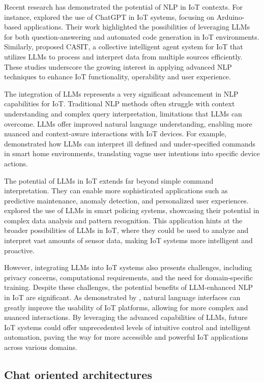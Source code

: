 \documentclass{ieeeaccess}
\begin{document}
Recent research has demonstrated the potential of NLP in IoT contexts. For instance, \citet{10315791} explored the use of ChatGPT in IoT systems, focusing on Arduino-based applications. Their work highlighted the possibilities of leveraging LLMs for both question-answering and automated code generation in IoT environments. Similarly, \citet{10439991} proposed CASIT, a collective intelligent agent system for IoT that utilizes LLMs to process and interpret data from multiple sources efficiently. These studies underscore the growing interest in applying advanced NLP techniques to enhance IoT functionality, operability and user experience.

The integration of LLMs represents a very significant advancement in NLP capabilities for IoT. Traditional NLP methods often struggle with context understanding and complex query interpretation, limitations that LLMs can overcome. LLMs offer improved natural language understanding, enabling more nuanced and context-aware interactions with IoT devices. For example, \citet{10.1145/3643505} demonstrated how LLMs can interpret ill defined and under-specified commands in smart home environments, translating vague user intentions into specific device actions.

The potential of LLMs in IoT extends far beyond simple command interpretation. They can enable more sophisticated applications such as predictive maintenance, anomaly detection, and personalized user experiences. \citet{10538107} explored the use of LLMs in smart policing systems, showcasing their potential in complex data analysis and pattern recognition. This application hints at the broader possibilities of LLMs in IoT, where they could be used to analyze and interpret vast amounts of sensor data, making IoT systems more intelligent and proactive.

However, integrating LLMs into IoT systems also presents challenges, including privacy concerns, computational requirements, and the need for domain-specific training. Despite these challenges, the potential benefits of LLM-enhanced NLP in IoT are significant. As demonstrated by \citet{9808139}, natural language interfaces can greatly improve the usability of IoT platforms, allowing for more complex and nuanced interactions. By leveraging the advanced capabilities of LLMs, future IoT systems could offer unprecedented levels of intuitive control and intelligent automation, paving the way for more accessible and powerful IoT applications across various domains.

\subsection{Chat oriented architectures}
\end{document}
